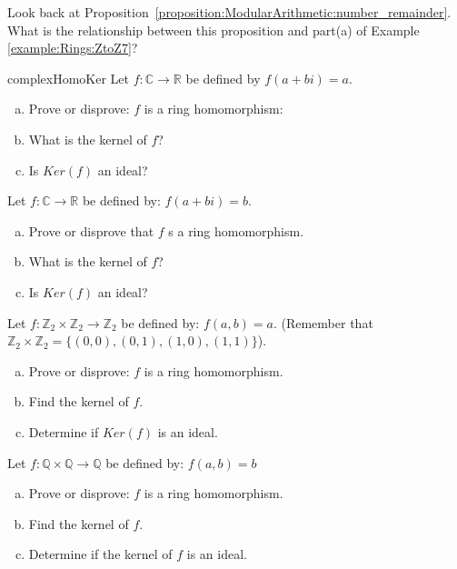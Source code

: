 \begin{exercise}{}
Look back at Proposition~\ref{proposition:ModularArithmetic:number_remainder}.   What is the relationship between this proposition and part(a) of Example \ref{example:Rings:ZtoZ7}?
\end{exercise}

\begin{exercise}{complexHomoKer}
Let $f:{\mathbb C}\rightarrow {\mathbb R}$ be defined by $f(a+bi)=a$.

\begin{enumerate}[(a)]
\item Prove or disprove: $f$ is a ring homomorphism:
\item What is the kernel of $f$?
\item Is $Ker(f)$ an ideal?
\end{enumerate}

\end{exercise}

\begin{exercise}{}
Let $f:{\mathbb C}\rightarrow {\mathbb R}$ be defined by: $f(a+bi)=b$.
\begin{enumerate}[(a)]
\item Prove or disprove that $f$ s a ring homomorphism.
\item What is the kernel of $f$?
\item Is $Ker(f)$ an ideal?
\end{enumerate}
\end{exercise}

\begin{exercise}{}
Let $f:{\mathbb Z}_2\times {\mathbb Z}_2\rightarrow {\mathbb Z}_2$ be defined by: $f(a,b)=a$.  (Remember that ${\mathbb Z}_2\times{\mathbb Z}_2=\{(0,0),(0,1),(1,0),(1,1)\}$).
\begin{enumerate}[(a)]
\item Prove or disprove: $f$ is a ring homomorphism.
\item Find the kernel of $f$.
\item Determine if $Ker(f)$ is an ideal.
\end{enumerate}
\end{exercise}
\begin{exercise}{}
Let $f:{\mathbb Q}\times {\mathbb Q}\rightarrow {\mathbb Q}$ be defined by: $f(a,b)=b$
\begin{enumerate}[(a)]
\item Prove or disprove: $f$ is a ring homomorphism.
\item Find the kernel of $f$.
\item Determine if the kernel of $f$ is an ideal.
\end{enumerate}
\end{exercise}

